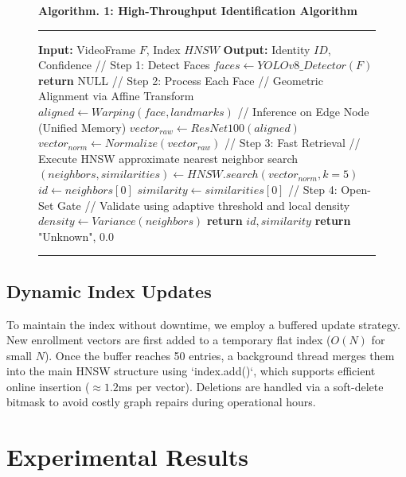 \documentclass[conference]{IEEEtran}
\newcommand{\RETURN}{\STATE \textbf{return} }
\begin{document}
\begin{figure}[htbp]
\centering
\vspace{0.2cm}
\textbf{Algorithm. 1: High-Throughput Identification Algorithm}
\hrule
\vspace{0.1cm}
\begin{algorithmic}[1]
\small
\STATE \textbf{Input:} VideoFrame $F$, Index $HNSW$
\STATE \textbf{Output:} Identity $ID$, Confidence
\STATE // Step 1: Detect Faces
\STATE $faces \leftarrow YOLOv8\_Detector(F)$
    \RETURN NULL
\ENDIF
\STATE // Step 2: Process Each Face
    \STATE // Geometric Alignment via Affine Transform
    \STATE $aligned \leftarrow Warping(face, landmarks)$
    \STATE // Inference on Edge Node (Unified Memory)
    \STATE $vector_{raw} \leftarrow ResNet100(aligned)$
    \STATE $vector_{norm} \leftarrow Normalize(vector_{raw})$
    \STATE // Step 3: Fast Retrieval
    \STATE // Execute HNSW approximate nearest neighbor search
    \STATE $(neighbors, similarities) \leftarrow HNSW.search(vector_{norm}, k=5)$
    \STATE $id \leftarrow neighbors[0]$
    \STATE $similarity \leftarrow similarities[0]$
    \STATE // Step 4: Open-Set Gate
    \STATE // Validate using adaptive threshold and local density
    \STATE $density \leftarrow Variance(neighbors)$
        \RETURN $id, similarity$
    \ELSE
        \RETURN "Unknown", 0.0
    \ENDIF
\ENDFOR 
\end{algorithmic}
\hrule
\label{fig:algo}
\end{figure}

\subsection{Dynamic Index Updates}
To maintain the index without downtime, we employ a buffered update strategy. New enrollment vectors are first added to a temporary flat index ($O(N)$ for small $N$). Once the buffer reaches 50 entries, a background thread merges them into the main HNSW structure using `index.add()`, which supports efficient online insertion ($\approx 1.2$ms per vector). Deletions are handled via a soft-delete bitmask to avoid costly graph repairs during operational hours.

\section{Experimental Results}
\end{document}
